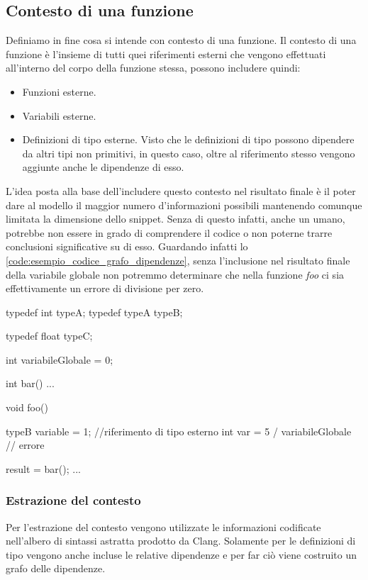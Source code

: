 \subsection{Contesto di una funzione} \label{subsec:context}
Definiamo in fine cosa si intende con contesto di una funzione.
Il contesto di una funzione è l'insieme di tutti quei riferimenti esterni che vengono effettuati all'interno del corpo della funzione stessa, possono includere quindi:
  \begin{itemize}
    \item Funzioni esterne.
    \item Variabili esterne.
    \item Definizioni di tipo esterne. Visto che le definizioni di tipo possono dipendere da altri tipi non primitivi, in questo caso, oltre al riferimento stesso vengono aggiunte anche le dipendenze di esso.
  \end{itemize}
L'idea posta alla base dell'includere questo contesto nel risultato finale è il poter dare al modello il maggior numero d'informazioni possibili mantenendo comunque limitata la dimensione dello snippet.
Senza di questo infatti, anche un umano, potrebbe non essere in grado di comprendere il codice o non poterne trarre conclusioni significative su di esso. 
Guardando infatti lo \autoref{code:esempio_codice_grafo_dipendenze}, senza l'inclusione nel risultato finale della variabile globale non potremmo determinare che nella funzione \textit{foo} ci sia effettivamente un errore di divisione per zero.

\begin{code}[language=c++, caption={Esempio di codice da cui ricavare dipendenze esterne }, label={code:esempio_codice_grafo_dipendenze}]

  typedef int typeA;
  typedef typeA typeB; 

  typedef float typeC;

  int variabileGlobale = 0;

  int bar(){
    ...
  }

  void foo(){
    typeB variable = 1; //riferimento di tipo esterno
    int var = 5 / variabileGlobale // errore
    
    result = bar();
    ...
  }

\end{code}

\subsubsection{Estrazione del contesto}\label{sec:estrazione_contesto}
Per l'estrazione del contesto vengono utilizzate le informazioni codificate nell'albero di sintassi astratta prodotto da Clang.
Solamente per le definizioni di tipo vengono anche incluse le relative dipendenze e per far ciò viene costruito un grafo delle dipendenze.

